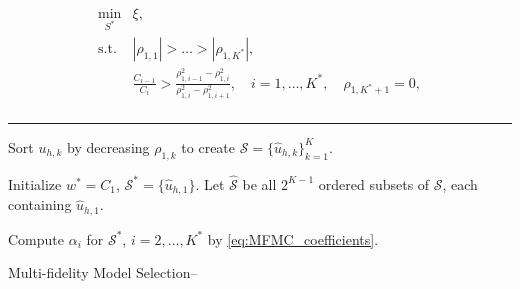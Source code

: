 \begin{equation*}\label{eq:Optimization_pb_model_selection}
    \begin{array}{lll}
    \displaystyle\min_{S^*} &\displaystyle \xi,\\
       \text{s.t.} &\displaystyle |\rho_{1,1}|>\ldots>|\rho_{1,K^*}|,\\
       &\displaystyle \frac{C_{i-1}}{C_i}>\frac{\rho_{1,i-1}^2-\rho_{1,i}^2}{\rho_{1,i}^2-\rho_{1,i+1}^2}, \quad i=1,\ldots,{K^*}, \quad \rho_{1,K^*+1}=0,\\
    \end{array}
\end{equation*}


\normalem
\begin{algorithm}[!ht]
\label{algo:MFMC_Algo_model_selection}
\DontPrintSemicolon    
   \vspace{1ex}
    
    \vspace{1ex}
    \hrule \vspace{1ex}

   
   
   Sort $u_{h, k}$ by decreasing $\rho_{1,k}$ to create $\mathcal{S}=\{\widehat u_{h, k}\}_{k=1}^K$. 
   
   Initialize $w^*=C_1$, $\mathcal{S}^*=\{\widehat u_{h, 1}\}$. Let $ \mathcal{\widehat S}$ be all $2^{K-1}$ ordered subsets of $\mathcal{S}$, each containing $\widehat u_{h, 1}$. 

    Compute $\alpha_i$ for $\mathcal{S}^*$, $i=2,\dots, K^*$ by \eqref{eq:MFMC_coefficients}.
\caption{Multi-fidelity Model Selection--}
\end{algorithm}
\ULforem


